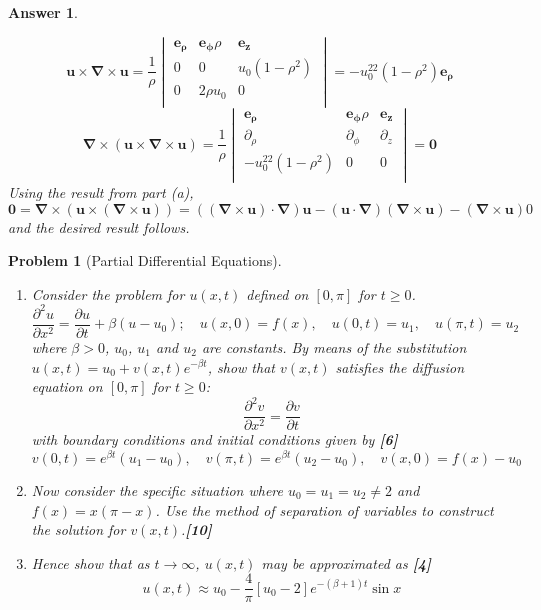 \documentclass[a4paper]{article}
\newtheorem{ans}{Answer}[section]
\theoremstyle{new}
\newtheorem{qns}{Problem}[section]
\begin{document}
\begin{ans}
\begin{enumerate}[label=(\alph*)]
$$\mathbf{u}\times\boldsymbol{\nabla}\times\mathbf{u}=\frac{1}{\rho}\begin{vmatrix}\boldsymbol{e_\rho}&\boldsymbol{e_\phi}\rho&\boldsymbol{e_z}\\0&0&u_0(1-\rho^2)\\0&2 \rho u_0&0\\\end{vmatrix}=-u_0^22(1-\rho^2)\boldsymbol{e_\rho}$$
$$\boldsymbol{\nabla}\times(\mathbf{u}\times\boldsymbol{\nabla}\times\mathbf{u})=\frac{1}{\rho}\begin{vmatrix}\boldsymbol{e_\rho}&\boldsymbol{e_\phi}\rho&\boldsymbol{e_z}\\\partial_\rho&\partial_\phi&\partial_z\\-u_0^22(1-\rho^2)&0&0\\\end{vmatrix}=\boldsymbol{0}$$
Using the result from part (a),
$$\boldsymbol{0}=\boldsymbol{\nabla}\times(\mathbf{u}\times(\boldsymbol{\nabla}\times\mathbf{u}))=((\boldsymbol{\nabla}\times\mathbf{u})\cdot\boldsymbol{\nabla})\mathbf{u}-(\mathbf{u}\cdot\boldsymbol{\nabla})(\boldsymbol{\nabla}\times\mathbf{u})-(\boldsymbol{\nabla}\times\mathbf{u})0$$
and the desired result follows.
\end{enumerate}
\end{ans}
\newpage
\begin{qns}[Partial Differential Equations]\leavevmode
\begin{enumerate}[label=(\alph*)]
    \item Consider the problem for $u(x,t)$ defined on $[0,\pi]$ for $t\geq0$.
$$\frac{\partial^2u}{\partial x^2}=\frac{\partial u}{\partial t}+\beta(u-u_0);\quad u(x,0)=f(x),\quad u(0,t)=u_1,\quad u(\pi,t)=u_2$$
where $\beta>0$, $u_0$, $u_1$ and $u_2$ are constants. By means of the substitution $u(x,t)=u_0+v(x,t)e^{-\beta t}$, show that $v(x,t)$ satisfies the diffusion equation on $[0,\pi]$ for $t\geq0$:
$$\frac{\partial^2v}{\partial x^2}=\frac{\partial v}{\partial t}$$
with boundary conditions and initial conditions given by \hfill \textbf{[6]}
$$v(0,t)=e^{\beta t}(u_1-u_0),\quad v(\pi,t)=e^{\beta t}(u_2-u_0),\quad v(x,0)=f(x)-u_0$$
\item Now consider the specific situation where $u_0=u_1=u_2\neq2$ and $f(x)=x(\pi-x)$. Use the method of separation of variables to construct the solution for $v(x,t)$.\hfill \textbf{[10]}
\item Hence show that as $t\rightarrow\infty$, $u(x,t)$ may be approximated as \hfill \textbf{[4]}
$$u(x,t)\approx u_0-\frac{4}{\pi}[u_0-2]e^{-(\beta+1)t}\sin x$$
\end{enumerate}
\end{qns}
\end{document}
